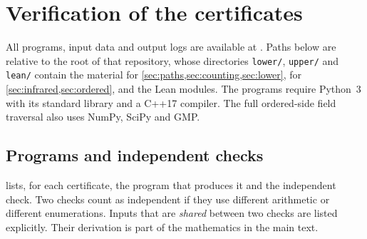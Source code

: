 \section{Verification of the certificates}\label{app:verification}

All programs, input data and output logs are available at \repo. Paths below are relative to the root of that repository, whose directories \nolinkurl{lower/}, \nolinkurl{upper/} and \nolinkurl{lean/} contain the material for \cref{sec:paths,sec:counting,sec:lower}, for \cref{sec:infrared,sec:ordered}, and the Lean modules. The programs require Python~3 with its standard library and a C++17 compiler. The full ordered-side field traversal also uses NumPy, SciPy and GMP.

\subsection{Programs and independent checks}

 lists, for each certificate, the program that produces it and the independent check. Two checks count as independent if they use different arithmetic or different enumerations. Inputs that are \emph{shared} between two checks are listed explicitly. Their derivation is part of the mathematics in the main text.

